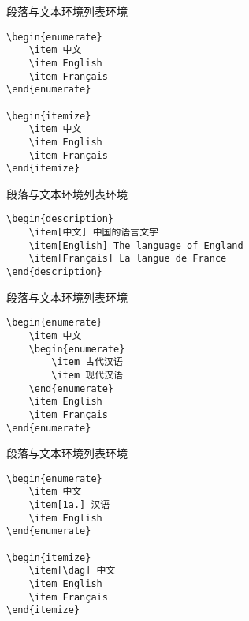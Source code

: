 \documentclass[11pt]{beamer}
\begin{document}
\begin{frame}[fragile]{段落与文本环境}{列表环境}
\begin{Verbatim}[tabsize=2]
\begin{enumerate}
	\item 中文
	\item English
	\item Français
\end{enumerate}

\begin{itemize}
	\item 中文
	\item English
	\item Français
\end{itemize}
\end{Verbatim}
\end{frame}

\begin{frame}[fragile]{段落与文本环境}{列表环境}
\begin{Verbatim}[tabsize=2]
\begin{description}
	\item[中文] 中国的语言文字
	\item[English] The language of England
	\item[Français] La langue de France
\end{description}
\end{Verbatim}
\end{frame}

\begin{frame}[fragile]{段落与文本环境}{列表环境}
\begin{Verbatim}[tabsize=2]
\begin{enumerate}
	\item 中文
	\begin{enumerate}
		\item 古代汉语
		\item 现代汉语
	\end{enumerate}
	\item English
	\item Français
\end{enumerate}
\end{Verbatim}
\end{frame}

\begin{frame}[fragile]{段落与文本环境}{列表环境}
\begin{Verbatim}[tabsize=2]
\begin{enumerate}
	\item 中文
	\item[1a.] 汉语
	\item English
\end{enumerate}

\begin{itemize}
	\item[\dag] 中文
	\item English
	\item Français
\end{itemize}
\end{Verbatim}
\end{frame}
\end{document}
